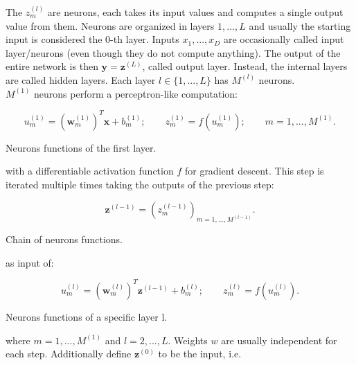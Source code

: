 \noindent The $z^{(l)}_m$ are neurons, each takes its input values and computes a single output value from them. Neurons are organized in layers $1,...,L$ and usually the starting input is considered the $0$-th layer. Inputs $x_1,...,x_D$ are occasionally called input layer/neurons (even though they do not compute anything). The output of the entire network is then $\bm{y}=\bm{z}^{(L)}$, called output layer. Instead, the internal layers are called hidden layers. Each layer $l\in \{1,...,L\}$ has $M^{(l)}$ neurons. \\

\noindent $M^{(1)}$ neurons perform a perceptron-like computation:

\begin{Equation}[H]
	\centering
	\begin{equation} \label{eq:neurbas}
		u^{(1)}_m = (\bm{w}^{(1)}_m)^T \bm{x} + b^{(1)}_m ; 
		\quad \quad
		z^{(1)}_m = f(u^{(1)}_m) ;
		\quad \quad
		m=1,...,M^{(1)} .
	\end{equation}
	\caption[Neurons functions of the first layer.]{Neurons functions of the first layer.}
\end{Equation}

\noindent with a differentiable activation function $f$ for gradient descent. This step is iterated multiple times taking the outputs of the previous step:

\begin{Equation}[H]
	\centering
	\begin{equation} \label{eq:neurbas2}
		\bm{z}^{(l-1)} = (z^{(l-1)}_m)_{m=1,...,M^{(l-1)}} .
	\end{equation}	
	\caption[Chain of neurons functions.]{Chain of neurons functions.}
\end{Equation}

\noindent as input of:

\begin{Equation}[H]
	\centering
	\begin{equation} \label{eq:neurbas3}
		u^{(l)}_m = (\bm{w}^{(l)}_m)^T \bm{z}^{(l-1)} + b^{(l)}_m ;
		\quad \quad
		z^{(l)}_m = f(u^{(l)}_m) .
	\end{equation}
	\caption[Neurons functions of a specific layer l.]{Neurons functions of a specific layer l.}
\end{Equation}

\noindent where $m=1,...,M^{(1)}$ and $l=2,...,L$. Weights $w$ are usually independent for each step. Additionally define $\bm{z}^{(0)}$ to be the input, i.e.


